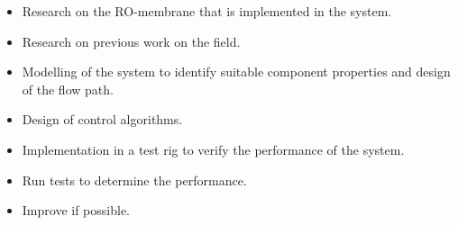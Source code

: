 \begin{itemize}
\renewcommand\labelitemi{-}
    \item Research on the RO-membrane that is implemented in the system.
    \item Research on previous work on the field.
    \item Modelling of the system to identify suitable component properties and design of the flow path.
    \item Design of control algorithms.
    \item Implementation in a test rig to verify the performance of the system.
    \item Run tests to determine the performance.
    \item Improve if possible.
\end{itemize}




